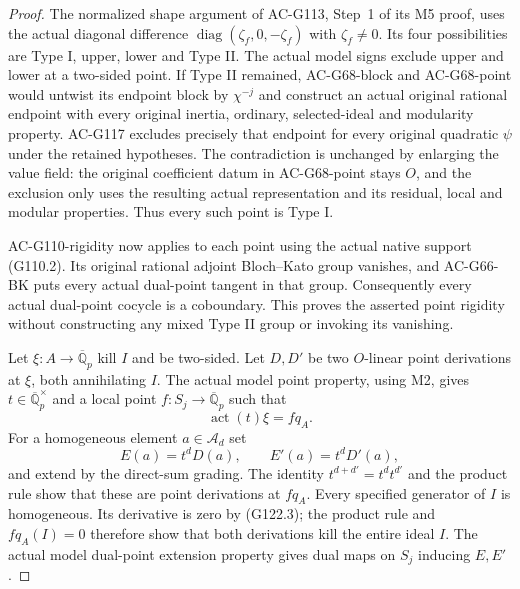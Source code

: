 \begin{proof}
The normalized shape argument of AC-G113, Step~1 of its M5 proof,
uses the actual diagonal difference
$\operatorname{diag}(\zeta_f,0,-\zeta_f)$ with $\zeta_f\ne0$.
Its four possibilities are Type I, upper, lower and Type II.
The actual model signs exclude upper and lower at a two-sided point.
If Type II remained, AC-G68-block and AC-G68-point would untwist its
endpoint block by $\chi^{-j}$ and construct an actual original rational
endpoint with every original inertia, ordinary, selected-ideal and
modularity property.  AC-G117 excludes precisely that endpoint for
every original quadratic $\psi$ under the retained hypotheses.
The contradiction is unchanged by enlarging the value field: the
original coefficient datum in AC-G68-point stays $O$, and the
exclusion only uses the resulting actual representation and its
residual, local and modular properties.  Thus every such point is
Type I.

AC-G110-rigidity now applies to each point using the actual native
support (G110.2).  Its original rational adjoint Bloch--Kato group
vanishes, and AC-G66-BK puts every actual dual-point tangent in that
group.  Consequently every actual dual-point cocycle is a coboundary.
This proves the asserted point rigidity without constructing any
mixed Type II group or invoking its vanishing.

Let $\xi:A\to\overline{\mathbb Q}_p$ kill $I$ and be two-sided.
Let $D,D'$ be two $O$-linear point derivations at $\xi$, both
annihilating $I$.  The actual model point property, using M2, gives
$t\in\overline{\mathbb Q}_p^\times$ and a local point
$f:S_j\to\overline{\mathbb Q}_p$ such that
\[
                   \operatorname{act}(t)\xi=fq_A.
                                                        \tag{G122.2}
\]
For a homogeneous element $a\in\mathcal A_d$ set
\[
                 E(a)=t^dD(a),\qquad E'(a)=t^dD'(a),
                                                        \tag{G122.3}
\]
and extend by the direct-sum grading.  The identity
$t^{d+d'}=t^dt^{d'}$ and the product rule show that these are point
derivations at $fq_A$.  Every specified generator of $I$ is
homogeneous.  Its derivative is zero by (G122.3); the product rule
and $fq_A(I)=0$ therefore show that both derivations kill the entire
ideal $I$.  The actual model dual-point extension property gives
dual maps on $S_j$ inducing $E,E'$.


\end{proof}
